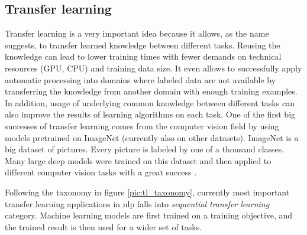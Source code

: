 \subsection{Transfer learning}
\label{sub:models}
Transfer learning is a very important idea because it allows, as the name suggests, to transfer learned knowledge between different tasks. 
Reusing the knowledge can lead to lower training times with fewer demands on technical resources (GPU, CPU) and training data size. It even allows to successfully apply automatic processing into domains where labeled data are not available by transferring the knowledge from another domain with enough training examples. In addition, usage of underlying common knowledge between different tasks can also improve the results of learning algorithms on each task. %
One of the first big successes of transfer learning comes from the computer vision field by using models pretrained on ImageNet (currently also on other datasets). ImageNet \citep{Russakovsky2015} is a big dataset of pictures. Every picture is labeled by one of a thousand classes. Many large deep models were trained on this dataset and then applied to different computer vision tasks with a great success \citep{Huh}.  %
\par
Following the taxonomy in figure \ref{pic:tl_taxonomy}, currently most important transfer learning applications in \acrshort{nlp} falls into \textit{sequential transfer learning} category. Machine learning models are first trained on a training objective, and the trained result is then used for a wider set of tasks.
